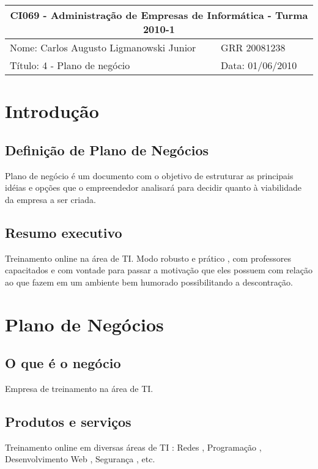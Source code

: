 \documentclass[10pt]{article}
\begin{document}
\setlength{\parskip}{2ex}

\begin{tabular}[l]{ | p{10cm} | l | } 
  \hline
  \multicolumn{2}{|c|}{CI069 - Administração de Empresas de Informática - Turma 2010-1} \\
  \hline 
  Nome: Carlos Augusto Ligmanowski Junior & 
  GRR 20081238 \\
  \hline 
  Título: 4 - Plano de negócio & 
  Data: 01/06/2010 \\
  \hline 
\end{tabular}

\vspace{1cm}

\section{Introdução}

\subsection{Definição de Plano de Negócios}
Plano de negócio é um documento com o objetivo de estruturar as principais idéias e opções que o empreendedor analisará para decidir quanto à viabilidade da empresa a ser criada.

\subsection{Resumo executivo}
Treinamento online na área de TI. Modo robusto e prático , com professores capacitados e com vontade para passar a motivação que eles possuem com relação ao que fazem em um ambiente bem humorado possibilitando a descontração.

\section{Plano de Negócios}

\subsection{O que é o negócio}
Empresa de treinamento na área de TI.

\subsection{Produtos e serviços}
Treinamento online em diversas áreas de TI : Redes , Programação , Desenvolvimento Web , Segurança , etc.
\end{document}
